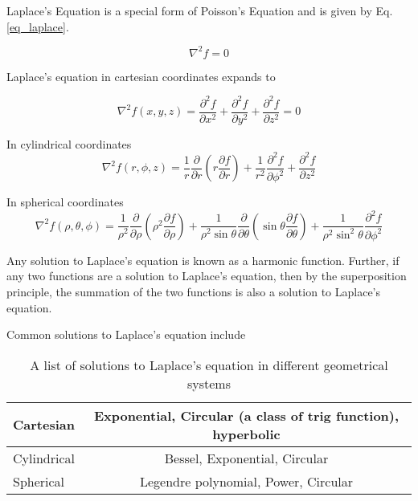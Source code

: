 \documentclass{article}
\numberwithin{equation}{subsection}
\begin{document}
Laplace's Equation is a special form of Poisson's Equation and is given by Eq. \ref{eq_laplace}.


\begin{equation} \label{eq_laplace}
\nabla^2 f = 0
\end{equation}

Laplace's equation in cartesian coordinates expands to

\begin{equation} \label{eq_laplace_cartesian}
\nabla^2 f(x, y, z) = \frac{\partial^2 f}{\partial x^2} + \frac{\partial^2 f}{\partial y^2} + \frac{\partial^2 f}{\partial z^2} = 0
\end{equation}

In cylindrical coordinates
\begin{equation} \label{eq_laplace_cylindrical}
\nabla^2 f(r, \phi, z) = \frac{1}{r} \frac{\partial}{\partial r}\left( r \frac{\partial f}{\partial r}\right) + \frac{1}{r^2}\frac{\partial^2 f}{\partial \phi^2} + \frac{\partial^2 f}{\partial z^2}
\end{equation}

In spherical coordinates
\begin{equation} \label{eq_laplace_spherical}
\nabla^2 f(\rho, \theta, \phi) = \frac{1}{\rho^2}\frac{\partial}{\partial \rho} \left( \rho^2 \frac{\partial f}{\partial \rho}\right) + \frac{1}{\rho^2 \sin \theta}\frac{\partial}{\partial \theta}\left( \sin \theta \frac{\partial f}{\partial \theta}\right) + \frac{1}{\rho^2 \sin^2 \theta} \frac{\partial^2 f}{\partial \phi^2}
\end{equation}

Any solution to Laplace's equation is known as a harmonic function. Further, if any two functions are a solution to Laplace's equation, then by the superposition principle, the summation of the two functions is also a solution to Laplace's equation.

Common solutions to Laplace's equation include

\begin{table}
\begin{center}
\label{tbl_laplace_solutions}
\caption{A list of solutions to Laplace's equation in different geometrical systems}
\begin{tabular}{|l|c|}
\hline
Cartesian & Exponential, Circular (a class of trig function), hyperbolic \\ \hline
Cylindrical & Bessel, Exponential, Circular \\ \hline
Spherical & Legendre polynomial, Power, Circular \\ \hline
\end{tabular}
\end{center}
\end{table}
\end{document}
